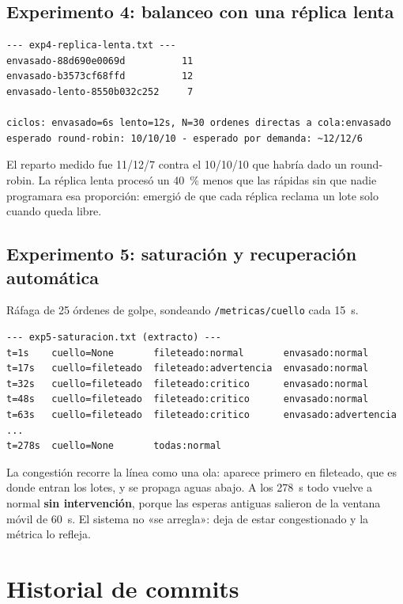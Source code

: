 \documentclass[12pt,a4paper]{article}
\begin{document}
\subsection{Experimento 4: balanceo con una réplica lenta}

\begin{lstlisting}
--- exp4-replica-lenta.txt ---
envasado-88d690e0069d          11
envasado-b3573cf68ffd          12
envasado-lento-8550b032c252     7

ciclos: envasado=6s lento=12s, N=30 ordenes directas a cola:envasado
esperado round-robin: 10/10/10 - esperado por demanda: ~12/12/6
\end{lstlisting}

El reparto medido fue 11/12/7 contra el 10/10/10 que habría dado un
round-robin. La réplica lenta procesó un 40~\% menos que las rápidas sin que
nadie programara esa proporción: emergió de que cada réplica reclama un lote
solo cuando queda libre.

\subsection{Experimento 5: saturación y recuperación automática}

Ráfaga de 25 órdenes de golpe, sondeando \texttt{/metricas/cuello} cada 15~s.

\begin{lstlisting}
--- exp5-saturacion.txt (extracto) ---
t=1s    cuello=None       fileteado:normal       envasado:normal
t=17s   cuello=fileteado  fileteado:advertencia  envasado:normal
t=32s   cuello=fileteado  fileteado:critico      envasado:normal
t=48s   cuello=fileteado  fileteado:critico      envasado:normal
t=63s   cuello=fileteado  fileteado:critico      envasado:advertencia
...
t=278s  cuello=None       todas:normal
\end{lstlisting}

La congestión recorre la línea como una ola: aparece primero en fileteado, que
es donde entran los lotes, y se propaga aguas abajo. A los 278~s todo vuelve a
normal \textbf{sin intervención}, porque las esperas antiguas salieron de la
ventana móvil de 60~s. El sistema no «se arregla»: deja de estar congestionado y
la métrica lo refleja.

\newpage
\section{Historial de commits}
\label{anexo:commits}
\end{document}
